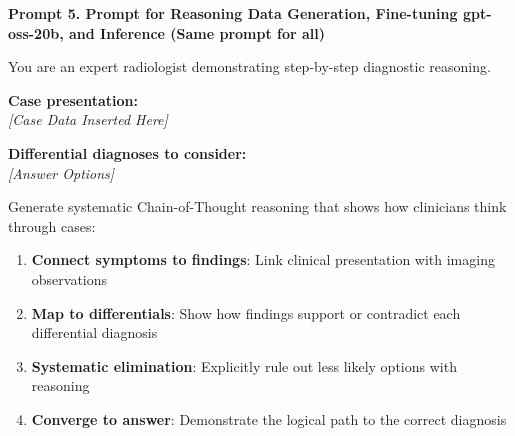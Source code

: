 \documentclass[10pt,journal,compsoc, onecolumn]{IEEEtran}
\begin{document}
\begin{baselinebox}
    \textbf{Prompt 5. Prompt for Reasoning Data Generation, Fine-tuning gpt-oss-20b, and Inference (Same prompt for all)}
    
    \vspace{1em}
    You are an expert radiologist demonstrating step-by-step diagnostic reasoning.
    
    \vspace{1em}
    \textbf{Case presentation:}
    \\
    \textit{[Case Data Inserted Here]}
    
    \vspace{1em}
    \textbf{Differential diagnoses to consider:}
    \\
    \textit{[Answer Options]}
    
    \vspace{1em}
    Generate systematic Chain-of-Thought reasoning that shows how clinicians think through cases:
    
    \begin{enumerate}[label=\arabic*., leftmargin=*, noitemsep, topsep=2pt]
        \item \textbf{Connect symptoms to findings}: Link clinical presentation with imaging observations
        \item \textbf{Map to differentials}: Show how findings support or contradict each differential diagnosis
        \item \textbf{Systematic elimination}: Explicitly rule out less likely options with reasoning
        \item \textbf{Converge to answer}: Demonstrate the logical path to the correct diagnosis
    \end{enumerate}
\end{baselinebox}

\vspace*{\fill} %
\clearpage %

\vspace*{4cm}
\end{document}
